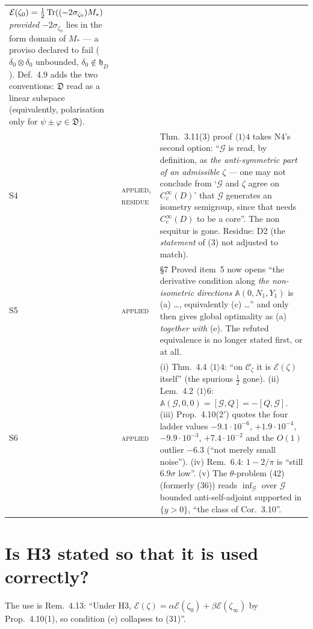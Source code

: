 \documentclass[11pt]{article}
\newcommand{\hh}{\mathfrak h}
\newcommand{\Aop}{\mathbb A}
\newcommand{\vA}{\textcolor{okgreen}{\textsc{applied}}}
\newcommand{\vP}{\textcolor{orange!80!black}{\textsc{applied, residue}}}
\begin{document}
{\begin{tabular}{@{}llp{9.9cm}@{}}
 $\mathcal E(\zeta_0)=\frac12\operatorname{Tr}((-2\sigma_{\zeta_0})M_*)$ \emph{provided}
 $-2\sigma_{\zeta_0}$ lies in the form domain of $M_*$ --- a proviso declared to fail
 ($\delta_0\otimes\delta_0$ unbounded, $\delta_0\notin\hh_D$).  Def.~4.9 adds the two
 conventions: $\mathfrak D$ read as a linear subspace (equivalently, polarisation only for
 $\psi\pm\varphi\in\mathfrak D$).\\
S4 & \vP & Thm.~3.11(3) proof $\langle1\rangle4$ takes N4's second option: ``$\mathcal G$
 is read, by definition, as \emph{the anti-symmetric part of an admissible} $\zeta$ --- one
 may not conclude from `$\mathcal G$ and $\zeta$ agree on $C_c^\infty(D)$' that $\mathcal G$
 generates an isometry semigroup, since that needs $C_c^\infty(D)$ to be a core''.  The non
 sequitur is gone.  Residue: D2 (the \emph{statement} of (3) not adjusted to match).\\
S5 & \vA & \S7 Proved item~5 now opens ``the derivative condition along \emph{the
 non-isometric directions} $\Aop(0,N_1,Y_1)$ is (a) \dots, equivalently (c) \dots'' and
 only then gives global optimality as (a) \emph{together with} (e).  The refuted
 equivalence is no longer stated first, or at all.\\
S6 & \vA & (i) Thm.~4.4 $\langle1\rangle4$: ``on $\mathcal C_\zeta$ it is
 $\mathcal E(\zeta)$ itself'' (the spurious $\frac12$ gone).  (ii) Lem.~4.2
 $\langle1\rangle6$: $\Aop(\mathcal G,0,0)=[\mathcal G,Q]=-[Q,\mathcal G]$.
 (iii) Prop.~4.10(2$'$) quotes the four ladder values $-9.1\cdot10^{-6}$, $+1.9\cdot10^{-4}$,
 $-9.9\cdot10^{-3}$, $+7.4\cdot10^{-2}$ and the $O(1)$ outlier $-6.3$ (``not merely small
 noise'').  (iv) Rem.~6.4: $1-2/\pi$ is ``still $6.9\sigma$ low''.  (v) The
 $\theta$-problem (42) (formerly (36)) reads $\inf_{\mathcal G}$ over $\mathcal G$ bounded
 anti-self-adjoint supported in $\{y>0\}$, ``the class of Cor.~3.10''.\\
\bottomrule
\end{tabular}}

\section{Is H3 stated so that it is used correctly?}\label{sec:h3}
The use is Rem.~4.13: ``Under H3, $\mathcal E(\zeta)=\alpha\mathcal E(\zeta_0)
+\beta\mathcal E(\zeta_\infty)$ by Prop.~4.10(1), so condition (e) collapses to (31)''.
\end{document}
